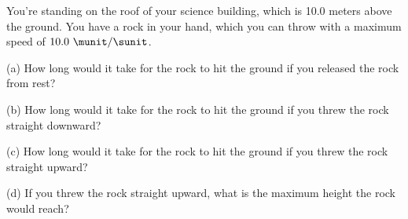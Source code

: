 
You're standing on the roof of your science building, which
is 10.0 meters above the ground. You have a rock in your hand, which
you can throw with a maximum speed of $10.0\ \munit/\sunit$.

(a) How long would it take for the rock to hit the ground if you
released the rock from rest?\answercheck\hwendpart

(b) How long would it take for the rock to hit the ground if you threw
the rock straight downward?\answercheck\hwendpart

(c) How long would it take for the rock to hit the ground if you threw
the rock straight upward?\answercheck\hwendpart

(d) If you threw the rock straight upward, what is the maximum height
the rock would reach?\answercheck
